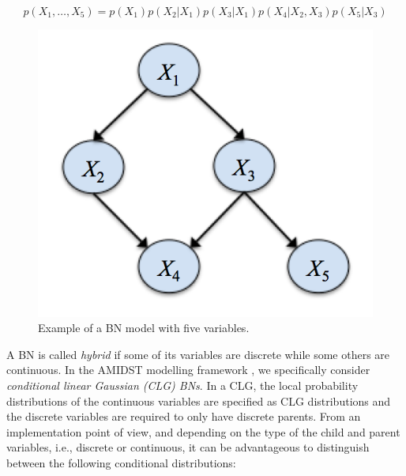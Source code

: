 \vspace{-0.15in}
$$p(X_1,\ldots,X_5) = p(X_1) p(X_2|X_1) p(X_3|X_1) p(X_4|X_2,X_3) p(X_5|X_3)$$

\begin{figure}[ht!]
\begin{center}
\includegraphics[scale=0.55]{./figures/ExampleBN}
\caption{\label{Figure:ExampleBN}Example of a BN model with five variables.}
\end{center}
\end{figure}

A BN is called \emph{hybrid} if some of its variables are discrete while some others are continuous. In the AMIDST modelling framework \cite{Deliverable2.1}, we specifically consider \emph{conditional linear Gaussian (CLG) BNs}\cite{Lauritzen1992,lauritzen1996graphical,LauritzenJensen2001}. In a CLG, the local probability distributions of the continuous variables are specified as CLG distributions and the discrete variables are required to only have discrete parents. From an implementation point of view, and depending on the type of the child and parent variables, i.e., discrete or continuous, it can be advantageous to distinguish between the following conditional distributions:

\vspace{-0.1in}

